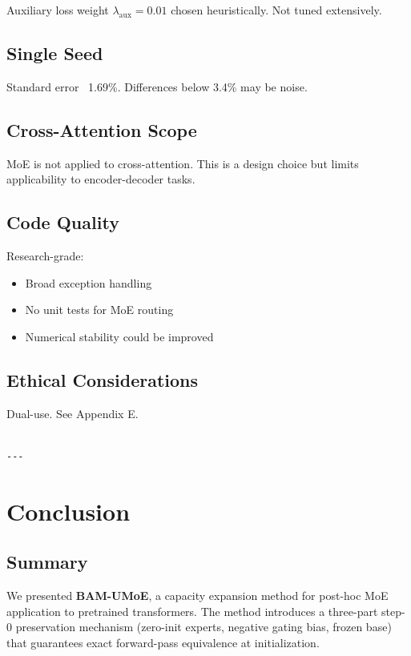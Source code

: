 Auxiliary loss weight $\lambda_\text{aux} = 0.01$ chosen 
heuristically. Not tuned extensively.

\subsection{Single Seed}

Standard error ~1.69\%. Differences below 3.4\% may be noise.

\subsection{Cross-Attention Scope}

MoE is not applied to cross-attention. This is a design choice but 
limits applicability to encoder-decoder tasks.

\subsection{Code Quality}

Research-grade:
\begin{itemize}
\item Broad exception handling
\item No unit tests for MoE routing
\item Numerical stability could be improved

\end{itemize}
\subsection{Ethical Considerations}

Dual-use. See Appendix E.
\begin{lstlisting}

---
\end{lstlisting}

\section{Conclusion}

\subsection{Summary}

We presented \textbf{BAM-UMoE}, a capacity expansion method for post-hoc MoE 
application to pretrained transformers. The method introduces a three-part 
step-0 preservation mechanism (zero-init experts, negative gating bias, 
frozen base) that guarantees exact forward-pass equivalence at 
initialization.

